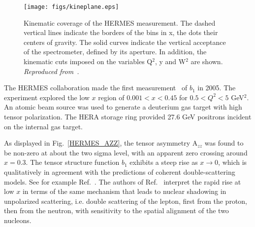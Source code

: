 

\begin{figure}
\begin{center}
\texttt{[image: figs/kineplane.eps]}
\caption{\label{HERMES_KIN} Kinematic coverage of the HERMES measurement.  The dashed vertical lines indicate the borders
of the bins in x, the dots their centers of gravity. The solid curves
indicate the
vertical acceptance of the spectrometer, defined by its aperture.
In addition, the
kinematic cuts imposed on the variables Q$^2$, y
and W$^2$ are shown. 
{\it Reproduced from~\cite{Riedl:2005jq}.}}
\end{center}\end{figure}


The HERMES collaboration  made the first measurement~\cite{Riedl:2005jq,Airapetian:2005cb} of
$b_1$ in 2005.
The experiment explored the low $x$ region of $0.001<x<0.45$ for  $0.5<Q^2<5$ GeV$^2$.  
An atomic beam source was used to generate a deuterium gas target with high tensor polarization.  
The HERA storage ring provided 27.6 GeV positrons incident on the internal gas target.

As displayed in Fig.~\ref{HERMES_AZZ}, the tensor asymmetry A$_{zz}$  was found to be 
non-zero at about the  two sigma level, with an apparent zero crossing around $x=0.3$. %
%
The tensor structure function $b_1$ exhibits a steep rise as $x\to 0$, which is qualitatively
in agreement with the predictions of coherent double-scattering models. See for example Ref.~\cite{Edelmann:1997ik}.  The authors of Ref.~\cite{Airapetian:2005cb} interpret the rapid rise at low $x$ in terms of the same mechanism that leads to nuclear shadowing in unpolarized scattering, i.e. double scattering of the lepton, first from the proton, then from the neutron, with sensitivity to the spatial alignment of the two nucleons.


